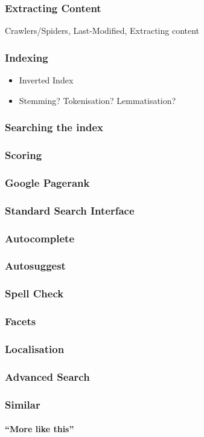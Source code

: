 \documentclass{beamer}
\begin{document}
\begin{frame}
  \frametitle{Extracting Content}
  Crawlers/Spiders, Last-Modified, Extracting content
\end{frame}

\begin{frame}
  \frametitle{Indexing}
  \begin{itemize}
  \item Inverted Index
  \item Stemming? Tokenisation? Lemmatisation?
  \end{itemize}
\end{frame}

\begin{frame}
  \frametitle{Searching the index}
\end{frame}


\begin{frame}
  \frametitle{Scoring}
\end{frame}

\begin{frame}
  \frametitle{Google Pagerank}
\end{frame}

\begin{frame}
  \frametitle{Standard Search Interface}
\end{frame}

\begin{frame}
  \frametitle{Autocomplete}
\end{frame}

\begin{frame}
  \frametitle{Autosuggest}
\end{frame}

\begin{frame}
  \frametitle{Spell Check}
\end{frame}

\begin{frame}
  \frametitle{Facets}
\end{frame}

\begin{frame}
  \frametitle{Localisation}
\end{frame}

\begin{frame}
  \frametitle{Advanced Search}
\end{frame}

\begin{frame}
  \frametitle{Similar}
  \framesubtitle{``More like this''}
\end{frame}
\end{document}

